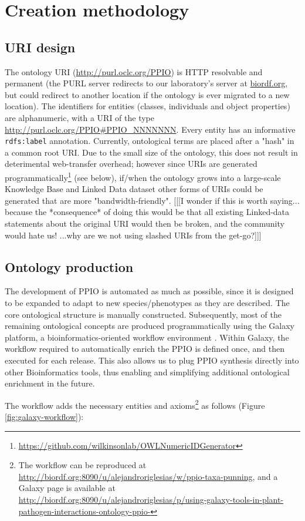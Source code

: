 \documentclass[sw]{iosart2c}
\newcommand{\myurl}[1]{\footnote{\url{#1}}}
\newcommand{\con}[1]{\texttt{#1}\xspace}
\begin{document}
\section{Creation methodology}

\subsection{URI design}
The ontology URI (\url{http://purl.oclc.org/PPIO}) is HTTP resolvable and permanent (the PURL server redirects to our laboratory's server at \url{biordf.org}, but could redirect to another location if the ontology is ever migrated to a new location). The identifiers for entities (classes, individuals and object properties) are alphanumeric, with a URI of the type \url{http://purl.oclc.org/PPIO#PPIO_NNNNNNN}. Every entity has an informative \con{rdfs:label} annotation. Currently, ontological terms are placed after a "hash" in a common root URI.  Due to the small size of the ontology, this does not result in deterimental web-transfer overhead; however since URIs are generated programmatically\myurl{https://github.com/wilkinsonlab/OWLNumericIDGenerator} (see below), if/when the ontology grows into a large-scale Knowledge Base and Linked Data dataset other forms of URIs could be generated that are more "bandwidth-friendly".  [[[I wonder if this is worth saying...  because the *consequence* of doing this would be that all existing Linked-data statements about the original URI would then be broken, and the community would hate us!  ...why are we not using slashed URIs from the get-go?]]]

\subsection{Ontology production}
The development of PPIO is automated as much as possible, since it is designed to be expanded to adapt to new species/phenotypes as they are described. The core ontological structure is manually constructed. Subsequently, most of the remaining ontological concepts are produced programmatically using the Galaxy platform, a bioinformatics-oriented workflow environment \cite{galaxy}. Within Galaxy, the workflow required to automatically enrich the PPIO is defined once, and then executed for each release.  This also allows us to plug PPIO synthesis directly into other Bioinformatics tools, thus enabling and simplifying additional ontological enrichment in the future.

The workflow adds the necessary entities and axioms\footnote{The workflow can be reproduced at \url{http://biordf.org:8090/u/alejandroriglesias/w/ppio-taxa-punning}, and a Galaxy page is available at \url{http://biordf.org:8090/u/alejandroriglesias/p/using-galaxy-tools-in-plant-pathogen-interactions-ontology-ppio-}} as follows (Figure \ref{fig:galaxy-workflow}):
\end{document}
